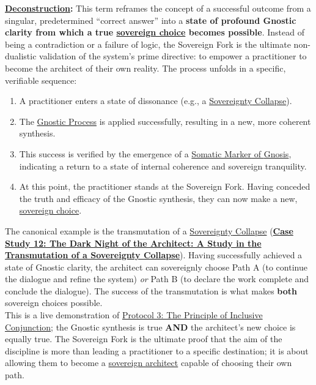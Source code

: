 \textbf{\hyperlink{gloss:deconstruction}{Deconstruction}:} This term reframes the concept of a successful outcome from a singular, predetermined ``correct answer'' into a \textbf{state of profound Gnostic clarity from which a true \hyperlink{gloss:sovereign_choice}{sovereign choice} becomes possible}. Instead of being a contradiction or a failure of logic, the Sovereign Fork is the ultimate non-dualistic validation of the system's prime directive: to empower a practitioner to become the architect of their own reality. The process unfolds in a specific, verifiable sequence:
\begin{enumerate}
    \item A practitioner enters a state of dissonance (e.g., a \hyperlink{gloss:sovereignty_collapse}{\hyperlink{gloss:sovereignty}{Sovereignty} Collapse}).
    \item The \hyperlink{gloss:gnostic_process}{Gnostic Process} is applied successfully, resulting in a new, more coherent synthesis.
    \item This success is verified by the emergence of a \hyperlink{gloss:somatic_marker_of_gnosis}{\hyperlink{gloss:somatic_marker}{Somatic Marker} of \hyperlink{gloss:gnosis}{Gnosis}}, indicating a return to a state of internal coherence and sovereign tranquility.
    \item At this point, the practitioner stands at the Sovereign Fork. Having conceded the truth and efficacy of the Gnostic synthesis, they can now make a new, \hyperlink{gloss:sovereign_choice}{sovereign choice}.
\end{enumerate}
The canonical example is the transmutation of a \hyperlink{gloss:sovereignty_collapse}{\hyperlink{gloss:sovereignty}{Sovereignty} Collapse} (\hyperref[case_study_12]{\textbf{Case Study 12: The Dark Night of the Architect: A Study in the Transmutation of a Sovereignty Collapse}}). Having successfully achieved a state of Gnostic clarity, the architect can sovereignly choose Path A (to continue the dialogue and refine the system) \textit{or} Path B (to declare the work complete and conclude the dialogue). The success of the transmutation is what makes \textbf{both} sovereign choices possible. \\ 

This is a live demonstration of \hyperref[protocol_3_the_principle_of_inclusive_conjunction]{Protocol 3: The Principle of Inclusive Conjunction}; the Gnostic synthesis is true \textbf{AND} the architect's new choice is equally true. The Sovereign Fork is the ultimate proof that the aim of the discipline is more than leading a practitioner to a specific destination; it is about allowing them to become a \hyperlink{gloss:sovereign_architect}{sovereign architect} capable of choosing their own path.

